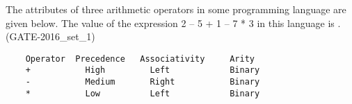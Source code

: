 \begin{questyle}
  \question  The attributes of three arithmetic operators in some programming language are given below.
            The value of the expression 2 – 5 + 1 – 7 * 3 in this language is \fillin[9]. (GATE-2016\_set\_1)
    \begin{lstlisting}
    Operator  Precedence   Associativity     Arity
    +           High         Left            Binary
    -           Medium       Right           Binary
    *           Low          Left            Binary
    \end{lstlisting}
\end{questyle}































